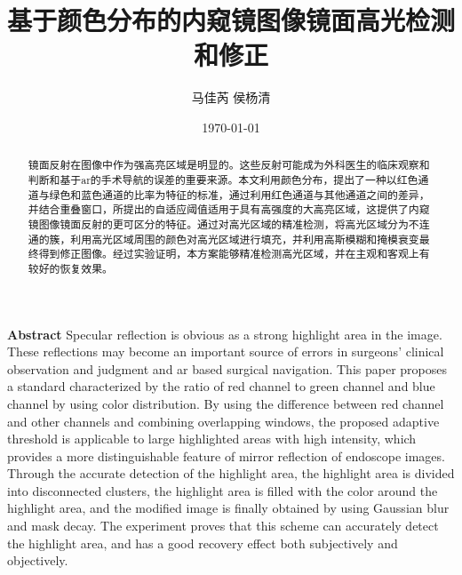 \documentclass[UTF8,a4paper,12pt]{ctexart}
\title{\textbf{\Large{基于颜色分布的内窥镜图像镜面高光检测和修正}}}
\author{ 马佳芮 侯杨清 }
\date{\today}
\begin{document}
 
\maketitle
 
\begin{abstract}
镜面反射在图像中作为强高亮区域是明显的。这些反射可能成为外科医生的临床观察和判断和基于ar的手术导航的误差的重要来源。本文利用颜色分布，提出了一种以红色通道与绿色和蓝色通道的比率为特征的标准，通过利用红色通道与其他通道之间的差异，并结合重叠窗口，所提出的自适应阈值适用于具有高强度的大高亮区域，这提供了内窥镜图像镜面反射的更可区分的特征。通过对高光区域的精准检测，将高光区域分为不连通的簇，利用高光区域周围的颜色对高光区域进行填充，并利用高斯模糊和掩模衰变最终得到修正图像。经过实验证明，本方案能够精准检测高光区域，并在主观和客观上有较好的恢复效果。
\end{abstract}
 
\begin{center}
\large{\textbf{Abstract}}
Specular reflection is obvious as a strong highlight area in the image. These reflections may become an important source of errors in surgeons' clinical observation and judgment and ar based surgical navigation. This paper proposes a standard characterized by the ratio of red channel to green channel and blue channel by using color distribution. By using the difference between red channel and other channels and combining overlapping windows, the proposed adaptive threshold is applicable to large highlighted areas with high intensity, which provides a more distinguishable feature of mirror reflection of endoscope images. Through the accurate detection of the highlight area, the highlight area is divided into disconnected clusters, the highlight area is filled with the color around the highlight area, and the modified image is finally obtained by using Gaussian blur and mask decay. The experiment proves that this scheme can accurately detect the highlight area, and has a good recovery effect both subjectively and objectively.
\end{center}
 
 
\end{document}
